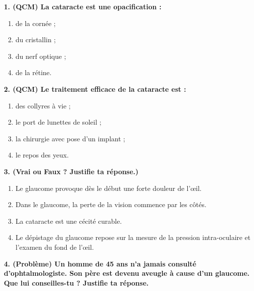 \documentclass[11pt]{article}
\begin{document}
\begin{exercice}
\textbf{1. (QCM) La cataracte est une opacification :}
\begin{enumerate}
    \item de la cornée ;
    \item du cristallin ;
    \item du nerf optique ;
    \item de la rétine.
\end{enumerate}

\textbf{2. (QCM) Le traitement efficace de la cataracte est :}
\begin{enumerate}
    \item des collyres à vie ;
    \item le port de lunettes de soleil ;
    \item la chirurgie avec pose d'un implant ;
    \item le repos des yeux.
\end{enumerate}

\textbf{3. (Vrai ou Faux ? Justifie ta réponse.)}
\begin{enumerate}
    \item Le glaucome provoque dès le début une forte douleur de l'œil.
    \item Dans le glaucome, la perte de la vision commence par les côtés.
    \item La cataracte est une cécité curable.
    \item Le dépistage du glaucome repose sur la mesure de la pression intra-oculaire et l'examen du fond de l'œil.
\end{enumerate}

\textbf{4. (Problème) Un homme de 45 ans n'a jamais consulté d'ophtalmologiste. Son père est devenu aveugle à cause d'un glaucome. Que lui conseilles-tu ? Justifie ta réponse.}
\end{exercice}
\end{document}
